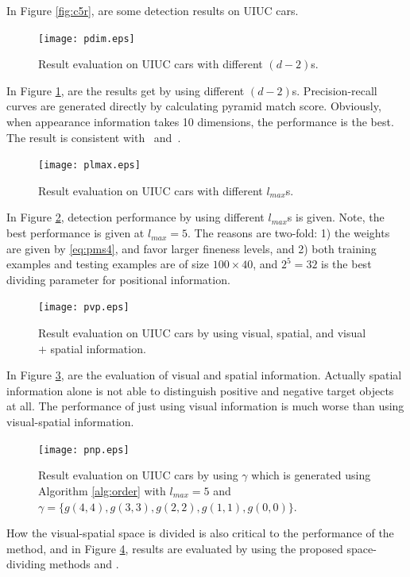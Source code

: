 In Figure \ref{fig:c5r}, are some detection results on UIUC cars. 


\begin{figure}[H]
\centering

\texttt{[image: pdim.eps]}


\caption[Result evaluation using different dimensions]{Result evaluation on UIUC cars with different $(d-2)$s.}
\label{fig:c52}
\end{figure}

In Figure \ref{fig:c52}, are the results get by using different $(d-2)$s. Precision-recall curves are generated directly by calculating pyramid match score. Obviously, when appearance information takes 10 dimensions, the performance is the best. The result is consistent with~\citep{pmk} and~\citep{lwz}.


\begin{figure}[H]
\centering

\texttt{[image: plmax.eps]}


\caption[Result evaluation using different largest fineness levels]{Result evaluation on UIUC cars with different $l_{max}$s.}
\label{fig:c53}
\end{figure}

In Figure \ref{fig:c53}, detection performance by using different $l_{max}$s is given. Note, the best performance is given at $l_{max}=5$. The reasons are two-fold: 1) the weights are given by \ref{eq:pms4}, and favor larger fineness levels, and 2) both training examples and testing examples are of size $100 \times 40$, and $2^5=32$ is the best dividing parameter for positional information.

\begin{figure}[H]
\centering

\texttt{[image: pvp.eps]}


\caption[Result evaluation by using results from only visual or spatial information]{Result evaluation on UIUC cars by using visual, spatial, and visual $+$ spatial information.}
\label{fig:c54}
\end{figure}

In Figure \ref{fig:c54}, are the evaluation of visual and spatial information. Actually spatial information alone is not able to distinguish positive and negative target objects at all. The performance of just using visual information is much worse than using visual-spatial information.

\begin{figure}[H]
\centering

\texttt{[image: pnp.eps]}


\caption[Result comparison with method using dividing methods of \citep{pmk}]{Result evaluation on UIUC cars by using $\gamma$ which is generated using Algorithm \ref{alg:order} with $l_{max}=5$ and $\gamma=\{g(4,4),g(3,3),g(2,2),g(1,1),g(0,0)\}$.}
\label{fig:c55}
\end{figure}
How the visual-spatial space is divided is also critical to the performance of the method, and in Figure \ref{fig:c55}, results are evaluated by using the proposed space-dividing methods and \citep{pmk}.


